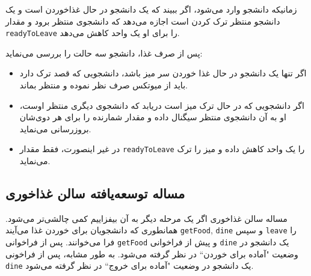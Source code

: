 \documentclass{book}
\begin{document}
    زمانیکه دانشجو وارد می‌شود، اگر ببیند که یک دانشجو در حال غذاخوردن است و یک دانشجو منتظر ترک کردن است اجازه می‌دهد که  دانشجوی منتظر 
    برود و مقدار  {\tt readyToLeave} را برای او یک واحد کاهش می‌دهد. 

\newpage
    پس از صرف غذا، دانشجو سه حالت را بررسی می‌نماید:

\begin{itemize}

\item %
    اگر تنها یک دانشجو در حال غذا خوردن سر میز باشد، دانشجویی که قصد ترک دارد باید از میوتکس صرف نظر نموده و منتظر بماند. 

\item %
    اگر دانشجویی که در حال ترک میز است دریابد که دانشجوی دیگری منتظر اوست، او به آن دانشجوی منتظر سیگنال داده و مقدار شمارنده را برای هر دوی‌شان
    بروزرسانی می‌نماید. 

\item %
    در غیر اینصورت، فقط مقدار  {\tt readyToLeave}  را یک واحد کاهش داده و میز را ترک می‌نماید.

\end{itemize}


\subsection{مساله توسعه‌یافته سالن غذاخوری}

    مساله سالن غذاخوری اگر یک مرحله دیگر به آن بیفزاییم کمی چالشی‌تر می‌شود. 
    همانطوری که دانشجویان برای خوردن غذا می‌آیند {\tt getFood}, {\tt dine}  و سپس {\tt leave} را فرا می‌خوانند. 
    پس از فراخوانی {\tt getFood}  و پیش از فراخوانی {\tt dine} یک دانشجو در وضعیت "آماده برای خوردن`` در نظر گرفته می‌شود. 
    به طور مشابه، پس از فراخونی {\tt dine} یک دانشجو در وضعیت "آماده برای خروج`` در نظر گرفته می‌شود. 
\end{document}
